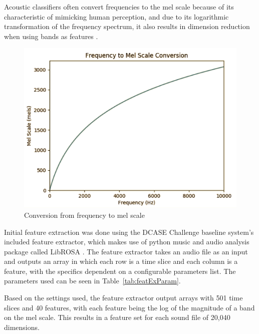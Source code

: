 \documentclass[11pt]{article}
\begin{document}
Acoustic classifiers often convert frequencies to the mel scale because of its characteristic of mimicking human perception, and due to its logarithmic transformation of the frequency spectrum, it also results in dimension reduction when using bands as features \cite{Stowell2014}.

\begin{figure}[!htbp]
	\centering
	\includegraphics[width=0.5\linewidth]{figures/hz2mel.png}
	\caption{Conversion from frequency to mel scale}
	\label{fig:hz2mel}
\end{figure}

Initial feature extraction was done using the DCASE Challenge baseline system's included feature extractor, which makes use of python music and audio analysis package called LibROSA \cite{Heittola2017}. The feature extractor takes an audio file as an input and outputs an array in which each row is a time slice and each column is a feature, with the specifics dependent on a configurable parameters list. The parameters used can be seen in Table~\ref{tab:featExParam}.

Based on the settings used, the feature extractor output arrays with 501 time slices and 40 features, with each feature being the log of the magnitude of a band on the mel scale. This results in a feature set for each sound file of 20,040 dimensions.
\end{document}
